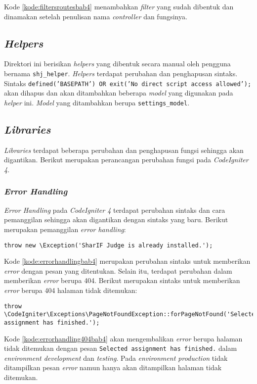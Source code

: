 Kode \ref{kode:filtersroutesbab4} menambahkan \textit{filter} yang sudah dibentuk dan dinamakan setelah penulisan nama \textit{controller} dan fungsinya. 

\subsection{\textit{Helpers}}
Direktori ini berisikan \textit{helpers} yang dibentuk secara manual oleh pengguna bernama \texttt{shj\_helper}. \textit{Helpers} terdapat perubahan dan penghapusan sintaks. Sintaks \texttt{defined('BASEPATH') OR exit('No direct script access allowed');} akan dihapus dan akan ditambahkan beberapa \textit{model} yang digunakan pada \textit{helper} ini. \textit{Model} yang ditambahkan berupa \texttt{settings\_model}.

\subsection{\textit{Libraries}}
\textit{Libraries} terdapat beberapa perubahan dan penghapusan fungsi sehingga akan digantikan. Berikut merupakan perancangan perubahan fungsi pada \textit{CodeIgniter 4}.

\subsubsection{\textit{Error Handling}}
\textit{Error Handling} pada \textit{CodeIgniter 4} terdapat perubahan sintaks dan cara pemanggilan sehingga akan digantikan dengan sintaks yang baru. Berikut merupakan pemanggilan \textit{error handling}:
\begin{lstlisting}[caption=Perubahan sintaks \textit{error handling}, label=kode:errorhandlingbab4]
	throw new \Exception('SharIF Judge is already installed.');
\end{lstlisting}
Kode \ref{kode:errorhandlingbab4} merupakan perubahan sintaks untuk memberikan \textit{error} dengan pesan yang ditentukan. Selain itu, terdapat perubahan dalam memberikan \textit{error} berupa 404. Berikut merupakan sintaks untuk memberikan \textit{error} berupa 404 halaman tidak ditemukan:
\begin{lstlisting}[caption=Perubahan sintaks \textit{error handling} 404, label=kode:errorhandling404bab4]
	throw \CodeIgniter\Exceptions\PageNotFoundException::forPageNotFound('Selected assignment has finished.');
\end{lstlisting}
Kode \ref{kode:errorhandling404bab4} akan mengembalikan \textit{error} berupa halaman tidak ditemukan dengan pesan \texttt{Selected assignment has finished.} dalam \textit{environment development} dan \textit{testing}. Pada \textit{environment production} tidak ditampilkan pesan \textit{error} namun hanya akan ditampilkan halaman tidak ditemukan.


